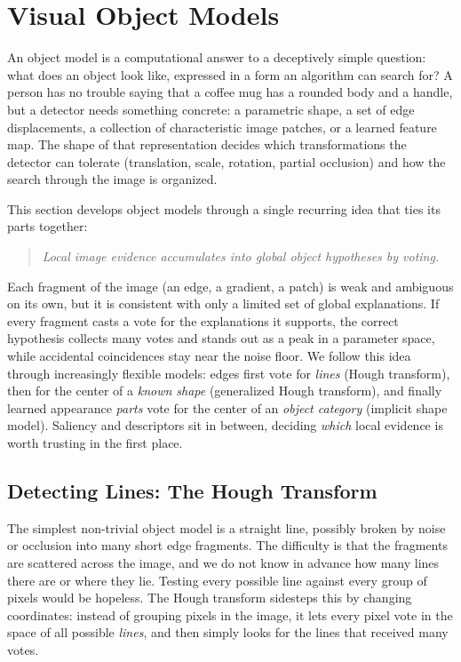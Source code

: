 \section{Visual Object Models}
\label{sec:visual-object-models}

An object model is a computational answer to a deceptively simple question: what
does an object look like, expressed in a form an algorithm can search for? A
person has no trouble saying that a coffee mug has a rounded body and a handle,
but a detector needs something concrete: a parametric shape, a set of edge
displacements, a collection of characteristic image patches, or a learned
feature map. The shape of that representation decides which transformations the
detector can tolerate (translation, scale, rotation, partial occlusion) and how
the search through the image is organized.

This section develops object models through a single recurring idea that ties
its parts together:

\begin{quote}
\emph{Local image evidence accumulates into global object hypotheses by voting.}
\end{quote}

\noindent
Each fragment of the image (an edge, a gradient, a patch) is weak and ambiguous
on its own, but it is consistent with only a limited set of global explanations.
If every fragment casts a vote for the explanations it supports, the correct
hypothesis collects many votes and stands out as a peak in a parameter space,
while accidental coincidences stay near the noise floor. We follow this idea
through increasingly flexible models: edges first vote for \emph{lines}
(Hough transform), then for the center of a \emph{known shape} (generalized
Hough transform), and finally learned appearance \emph{parts} vote for the
center of an \emph{object category} (implicit shape model). Saliency and
descriptors sit in between, deciding \emph{which} local evidence is worth
trusting in the first place.

\subsection{Detecting Lines: The Hough Transform}

The simplest non-trivial object model is a straight line, possibly broken by
noise or occlusion into many short edge fragments. The difficulty is that the
fragments are scattered across the image, and we do not know in advance how many
lines there are or where they lie. Testing every possible line against every
group of pixels would be hopeless. The Hough transform sidesteps this by changing
coordinates: instead of grouping pixels in the image, it lets every pixel vote in
the space of all possible \emph{lines}, and then simply looks for the lines that
received many votes.

